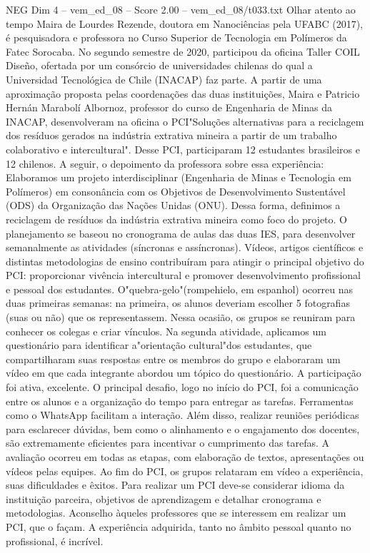 \begin{textsample}{NEG Dim 4 – vem\_ed\_08 – Score 2.00 – vem\_ed\_08/t033.txt}  \label{ex:f4_neg_028}
Olhar atento ao tempo Maira de Lourdes Rezende, doutora em Nanociências pela UFABC (2017), é pesquisadora e professora no Curso Superior de Tecnologia em Polímeros da Fatec Sorocaba.
No segundo semestre de 2020, participou da oficina Taller COIL Diseño, ofertada por um consórcio de universidades chilenas do qual a Universidad Tecnológica de Chile (INACAP) faz parte.
A partir de uma aproximação proposta pelas coordenações das duas instituições, Maira e Patricio Hernán Marabolí Albornoz, professor do curso de Engenharia de Minas da INACAP, desenvolveram na oficina o PCI"Soluções alternativas para a reciclagem dos resíduos gerados na indústria extrativa mineira a partir de um trabalho colaborativo e intercultural".
Desse PCI, participaram 12 estudantes brasileiros e 12 chilenos.
A seguir, o depoimento da professora sobre essa experiência: Elaboramos um projeto interdisciplinar (Engenharia de Minas e Tecnologia em Polímeros) em consonância com os Objetivos de Desenvolvimento Sustentável (ODS) da Organização das Nações Unidas (ONU).
Dessa forma, definimos a reciclagem de resíduos da indústria extrativa mineira como foco do projeto.
O planejamento se baseou no cronograma de aulas das duas IES, para desenvolver semanalmente as atividades (síncronas e assíncronas).
Vídeos, artigos científicos e distintas metodologias de ensino contribuíram para atingir o principal objetivo do PCI: proporcionar vivência intercultural e promover desenvolvimento profissional e pessoal dos estudantes.
O"quebra-gelo"(rompehielo, em espanhol) ocorreu nas duas primeiras semanas: na primeira, os alunos deveriam escolher 5 fotografias (suas ou não) que os representassem.
Nessa ocasião, os grupos se reuniram para conhecer os colegas e criar vínculos.
Na segunda atividade, aplicamos um questionário para identificar a"orientação cultural"dos estudantes, que compartilharam suas respostas entre os membros do grupo e elaboraram um vídeo em que cada integrante abordou um tópico do questionário.
A participação foi ativa, excelente.
O principal desafio, logo no início do PCI, foi a comunicação entre os alunos e a organização do tempo para entregar as tarefas.
Ferramentas como o WhatsApp facilitam a interação.
Além disso, realizar reuniões periódicas para esclarecer dúvidas, bem como o alinhamento e o engajamento dos docentes, são extremamente eficientes para incentivar o cumprimento das tarefas.
A avaliação ocorreu em todas as etapas, com elaboração de textos, apresentações ou vídeos pelas equipes.
Ao fim do PCI, os grupos relataram em vídeo a experiência, suas dificuldades e êxitos.
Para realizar um PCI deve-se considerar idioma da instituição parceira, objetivos de aprendizagem e detalhar cronograma e metodologias.
Aconselho àqueles professores que se interessem em realizar um PCI, que o façam.
A experiência adquirida, tanto no âmbito pessoal quanto no profissional, é incrível.

\end{textsample}
